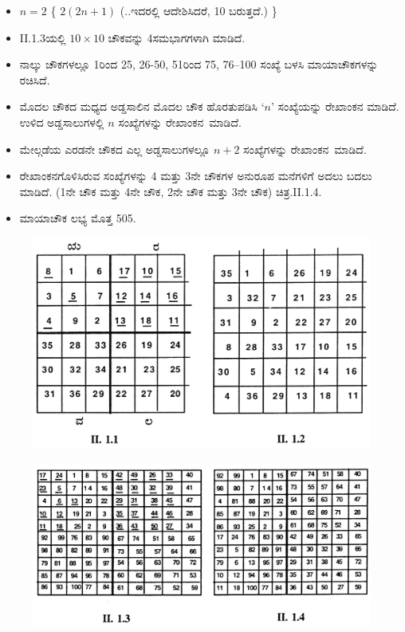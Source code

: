 \begin{itemize}
	\item $n=2$ \{ $2(2n+1)$ (..ಇದರಲ್ಲಿ ಆದೇಶಿಸಿದರೆ, 10 ಬರುತ್ತದೆ.) \}
	\item II.1.3ಯಲ್ಲಿ $10\times 10$ ಚೌಕವನ್ನು 4ಸಮಭಾಗಗಳಾಗಿ ಮಾಡಿದೆ.
	\item ನಾಲ್ಕು ಚೌಕಗಳಲ್ಲೂ 1ರಿಂದ 25, 26-50, 51ರಿಂದ 75, 76--100 ಸಂಖ್ಯೆ ಬಳಸಿ ಮಾಯಾಚೌಕಗಳನ್ನು ರಚಿಸಿದೆ.
	\item ಮೊದಲ ಚೌಕದ ಮಧ್ಯದ ಅಡ್ಡಸಾಲಿನ ಮೊದಲ ಚೌಕ ಹೊರತುಪಡಿಸಿ $‘n’$ ಸಂಖ್ಯೆ\-ಯನ್ನು ರೇಖಾಂಕನ ಮಾಡಿದೆ. ಉಳಿದ ಅಡ್ಡಸಾಲುಗಳಲ್ಲಿ $n$ ಸಂಖ್ಯೆಗಳನ್ನು \hbox{ರೇಖಾಂಕನ ಮಾಡಿದೆ.}
	\item ಮೇಲ್ಗಡೆಯ ಎರಡನೇ ಚೌಕದ ಎಲ್ಲ ಅಡ್ಡಸಾಲುಗಳಲ್ಲೂ $n+2$ ಸಂಖ್ಯೆಗಳನ್ನು \hbox{ರೇಖಾಂಕನ ಮಾಡಿದೆ.}
	\item ರೇಖಾಂಕನಗೊಳಿಸಿರುವ ಸಂಖ್ಯೆಗಳನ್ನು 4 ಮತ್ತು 3ನೇ ಚೌಕಗಳ ಅನುರೂಪ ಮನೆ\-ಗಳಿಗೆ ಅದಲು ಬದಲು ಮಾಡಿದೆ. (1ನೇ ಚೌಕ ಮತ್ತು 4ನೇ ಚೌಕ, 2ನೇ ಚೌಕ ಮತ್ತು 3ನೇ ಚೌಕ) ಚಿತ್ರ.II.1.4.
	\item ಮಾಯಾಚೌಕ ಲಭ್ಯ ಮೊತ್ತ 505.
\end{itemize}
\begin{figure}[H]
\includegraphics[scale=.8]{src/figures/chap3/fig3-14.jpg}
\end{figure}
\begin{figure}[H]
\includegraphics{src/figures/chap3/fig3-15.jpg}
\end{figure}

